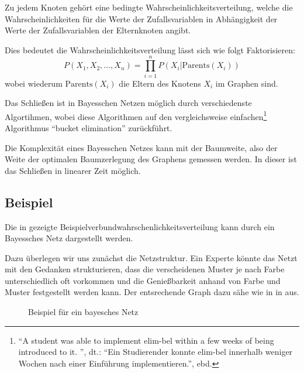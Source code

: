 \documentclass{llncs}
\begin{document}
Zu jedem Knoten gehört eine bedingte Wahrscheinlichkeitsverteilung, welche die Wahrscheinlichkeiten für die Werte der Zufallsvariablen in Abhängigkeit der Werte der Zufallsvariablen der Elternknoten angibt. 

Dies bedeutet die Wahrscheinlichkeitsverteilung lässt sich wie folgt Faktorisieren: 
\[ P(X_1,X_2,\dots,X_n) = \prod_{i=1}^n P(X_i | \mbox{Parents}(X_i)) \]
wobei wiederum $\mbox{Parents}(X_i)$ die Eltern des Knotens $X_i$ im Graphen sind. 

Das Schließen ist in Bayesschen Netzen möglich durch verschiedenste Algortihmen, wobei \cite{dechter1996bucket} diese Algorithmen auf den vergleichsweise einfachen\footnote{``A student was able to implement elim-bel within a few weeks of being introduced to it. '', dt.: ``Ein Studierender konnte elim-bel innerhalb weniger Wochen nach einer Einführung implementieren.'', ebd.} Algorithmus ``bucket elimination'' zurückführt. 

Die Komplexität eines Bayesschen Netzes kann mit der Baumweite, also der Weite der optimalen Baumzerlegung des Graphens gemessen werden. In dieser ist das Schließen in linearer Zeit möglich. 

\subsection{Beispiel}

Die in  gezeigte Beispielverbundwahrschenlichkeitsverteilung kann durch ein Bayessches Netz dargestellt werden. 

Dazu überlegen wir uns zunächst die Netzstruktur. Ein Experte könnte das Netzt mit den Gedanken strukturieren, dass die verscheidenen Muster je nach Farbe unterschiedlich oft vorkommen und die Genießbarkeit anhand von Farbe und Muster festgestellt werden kann. Der entsrechende Graph dazu sähe wie in in  aus.

\begin{figure}[htb]
\caption{\label{fig:bayesnetwork}Beispiel für ein bayesches Netz}
\centering
{}
\end{figure}
\end{document}
